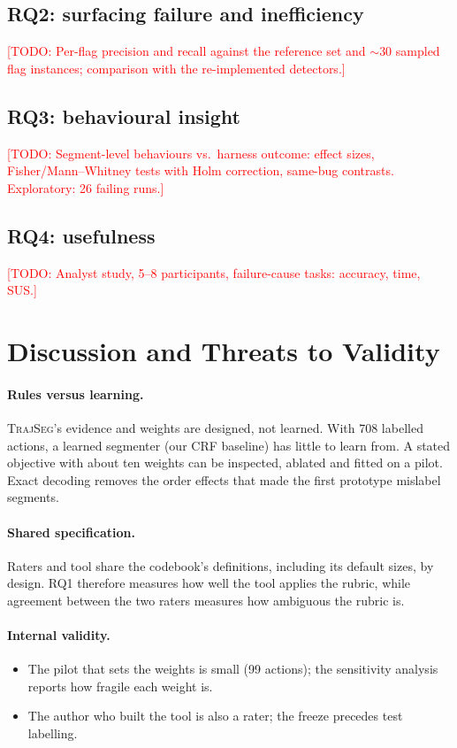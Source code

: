\documentclass[sigconf,nonacm,10pt]{acmart}
\newcommand{\TODO}[1]{\textcolor{red}{[TODO: #1]}}
\newcommand{\tool}{\textsc{TrajSeg}}   %
\begin{document}
\subsection{RQ2: surfacing failure and inefficiency}
\TODO{Per-flag precision and recall against the reference set and ${\sim}30$ sampled
flag instances; comparison with the re-implemented detectors.}

\subsection{RQ3: behavioural insight}
\TODO{Segment-level behaviours vs.\ harness outcome: effect sizes, Fisher/Mann--Whitney
tests with Holm correction, same-bug contrasts. Exploratory: 26 failing runs.}

\subsection{RQ4: usefulness}
\TODO{Analyst study, 5--8 participants, failure-cause tasks: accuracy, time, SUS.}

\section{Discussion and Threats to Validity}
\label{sec:discussion}

\paragraph{Rules versus learning.} \tool{}'s evidence and weights are designed, not
learned. With 708 labelled actions, a learned segmenter (our CRF baseline) has little to
learn from. A stated objective with about ten weights can be inspected, ablated and
fitted on a pilot. Exact decoding removes the order effects that made the first
prototype mislabel segments.

\paragraph{Shared specification.} Raters and tool share the codebook's definitions,
including its default sizes, by design. RQ1 therefore measures how well the tool
applies the rubric, while agreement between the two raters measures how ambiguous the
rubric is.

\paragraph{Internal validity.}
\begin{itemize}
  \item The pilot that sets the weights is small (99 actions); the sensitivity analysis
        reports how fragile each weight is.
  \item The author who built the tool is also a rater; the freeze precedes test
        labelling.
\end{itemize}
\end{document}
